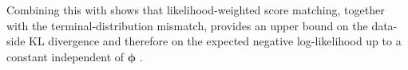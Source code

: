 Combining this with  shows that likelihood-weighted
score matching, together with the terminal-distribution mismatch, provides
an upper bound on the data-side KL divergence and therefore on the expected
negative log-likelihood up to a constant independent of $\bm{\phi}$
\citep{song2021maximum}.